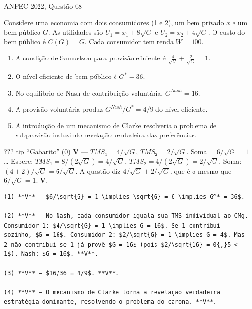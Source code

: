 \documentclass[11pt,twoside,openright]{book}
\begin{document}
\begin{infobox}{ANPEC 2022, Questão 08}

Considere uma economia com dois consumidores (1 e 2), um bem privado
\(x\) e um bem público \(G\). As utilidades são
\(U_1 = x_1 + 8\sqrt{G}\) e \(U_2 = x_2 + 4\sqrt{G}\). O custo do bem
público é \(C(G) = G\). Cada consumidor tem renda \(W = 100\).

\begin{enumerate}
\def\labelenumi{(\arabic{enumi})}
\setcounter{enumi}{-1}
\item
  A condição de Samuelson para provisão eficiente é
  \(\frac{4}{\sqrt{G}} + \frac{2}{\sqrt{G}} = 1\).
\item
  O nível eficiente de bem público é \(G^* = 36\).
\item
  No equilíbrio de Nash de contribuição voluntária, \(G^{Nash} = 16\).
\item
  A provisão voluntária produz \(G^{Nash}/G^* = 4/9\) do nível
  eficiente.
\item
  A introdução de um mecanismo de Clarke resolveria o problema de
  subprovisão induzindo revelação verdadeira das preferências.
\end{enumerate}

??? tip ``Gabarito'' (0) \textbf{V} --- \(TMS_1 = 4/\sqrt{G}\),
\(TMS_2 = 2/\sqrt{G}\). Soma = \(6/\sqrt{G} = 1\)\ldots{} Espere:
\(TMS_1 = 8/(2\sqrt{G}) = 4/\sqrt{G}\),
\(TMS_2 = 4/(2\sqrt{G}) = 2/\sqrt{G}\). Soma:
\((4+2)/\sqrt{G} = 6/\sqrt{G}\). A questão diz
\(4/\sqrt{G} + 2/\sqrt{G}\), que é o mesmo que \(6/\sqrt{G} = 1\).
\textbf{V}.

\begin{verbatim}
(1) **V** — $6/\sqrt{G} = 1 \implies \sqrt{G} = 6 \implies G^* = 36$.

(2) **V** — No Nash, cada consumidor iguala sua TMS individual ao CMg. Consumidor 1: $4/\sqrt{G} = 1 \implies G = 16$. Se 1 contribui sozinho, $G = 16$. Consumidor 2: $2/\sqrt{G} = 1 \implies G = 4$. Mas 2 não contribui se 1 já provê $G = 16$ (pois $2/\sqrt{16} = 0{,}5 < 1$). Nash: $G = 16$. **V**.

(3) **V** — $16/36 = 4/9$. **V**.

(4) **V** — O mecanismo de Clarke torna a revelação verdadeira estratégia dominante, resolvendo o problema do carona. **V**.
\end{verbatim}

\end{infobox}
\end{document}
